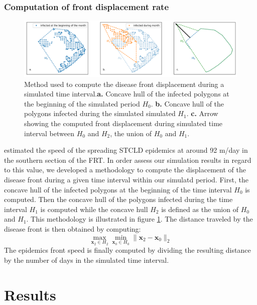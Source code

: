 \documentclass[utf8]{frontiersSCNS}
\begin{document}
\subsubsection{Computation of front displacement rate}
\begin{figure}
    \centering
    \includegraphics[width=.95\textwidth]{figures/hull_example.png}
    \caption{Method used to compute the disease front displacement during a simulated time interval.\textbf{a.} Concave hull of the infected polygons at the beginning of the simulated period $H_0$. \textbf{b.} Concave hull of the polygons infected during the simulated simulated $H_1$. \textbf{c.} Arrow showing the computed front displacement during simulated time interval between $H_0$ and $H_2$, the union of $H_0$ and $H_1$.}
    \label{fig:hull}
\end{figure}
\citep{muller2020spatial} estimated the speed of the spreading STCLD epidemics at around 92 m/day in the southern section of the FRT. In order assess our simulation results in regard to this value, we developed a methodology to compute the displacement of the disease front during a given time interval within our simulatd period. First, the concave hull of the infected polygons at the beginning of the time interval $H_0$ is computed. Then the concave hull of the polygons infected during the time interval $H_1$ is computed while the concave hull $H_2$ is defined as the union of $H_0$ and $H_1$. This methodology is illustrated in figure \ref{fig:hull}. The distance traveled by the disease front is then obtained by computing:
\begin{equation}
    \max\limits_{\mathbf{x}_2\in H_2}\min\limits_{\mathbf{x}_0\in H_0} \|\mathbf{x}_2 - \mathbf{x}_0\|_2
\end{equation}
The epidemics front speed is finally computed by dividing the resulting distance by the number of days in the simulated time interval.

\section{Results}
\end{document}
